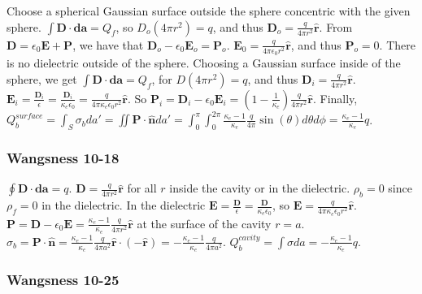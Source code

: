 \documentclass[oneside]{book}
\theoremstyle{definition}
\newcommand*\B[1]{\mathbf{#1}}
\newcommand*\Bh[1]{\mathbf{\hat{#1}}}
\begin{document}
Choose a spherical Gaussian surface outside the sphere concentric with the given sphere. $\int \B{D}\cdot \B{da} = Q_f$, so $D_o (4\pi r^2) = q$, and thus $\B{D}_o = \frac{q}{4\pi r^2} \Bh{r}$. From $\B{D} = \epsilon_0 \B{E}+\B{P}$, we have that $\B{D}_o - \epsilon_0 \B{E}_o = \B{P}_o$. $\B{E}_0 = \frac{q}{4\pi \epsilon_0 r^2}\Bh{r}$, and thus $\B{P}_o = 0$. There is no dielectric outside of the sphere. Choosing a Gaussian surface inside of the sphere, we get $\int \B{D}\cdot \B{da} = Q_f$, for $D(4\pi r^2) = q$, and thus $\B{D}_i = \frac{q}{4\pi r^2} \Bh{r}$. $\B{E}_i = \frac{\B{D}_i}{\epsilon} = \frac{\B{D}_i}{\kappa_e \epsilon_0} = \frac{q}{4\pi \kappa_{e} \epsilon_0 r^2}\Bh{r}$. So $\B{P}_i = \B{D}_i - \epsilon_0 \B{E}_i = (1-\frac{1}{\kappa_{e}}) \frac{q}{4\pi r^2} \Bh{r}$. Finally, $Q_b^{surface} = \int_{S} \sigma_{b} da' = \iint \B{P}\cdot \Bh{n} da' = \int_{0}^{\pi} \int_{0}^{2\pi} \frac{\kappa_e-1}{\kappa_e} \frac{q}{4\pi} \sin(\theta) d\theta d\phi = \frac{\kappa_e-1}{\kappa_e} q$.

\subsubsection{Wangsness 10-18}

$\oint \B{D} \cdot \B{da} = q$. $\B{D} = \frac{q}{4\pi r^2} \Bh{r}$ for all $r$ inside the cavity or in the dielectric. $\rho_b = 0$ since $\rho_f = 0$ in the dielectric. In the dielectric $\B{E} = \frac{\B{D}}{\epsilon} = \frac{\B{D}}{\kappa_e \epsilon_0}$, so $\B{E} = \frac{q}{4\pi \kappa_e \epsilon_0 r^2}\Bh{r}$. $\B{P} = \B{D}- \epsilon_0 \B{E} = \frac{\kappa_e-1}{\kappa_e} \frac{q}{4\pi r^2} \Bh{r}$ at the surface of the cavity $r=a$. $\sigma_b = \B{P}\cdot \Bh{n} = \frac{\kappa_e-1}{\kappa_e} \frac{q}{4\pi a^2} \Bh{r}\cdot (-\Bh{r}) = - \frac{\kappa_e-1}{\kappa_e} \frac{q}{4\pi a^2}$. $Q_b^{cavity} = \int \sigma da = - \frac{\kappa_e-1}{\kappa_e}q$.

\subsubsection{Wangsness 10-25}
\end{document}
